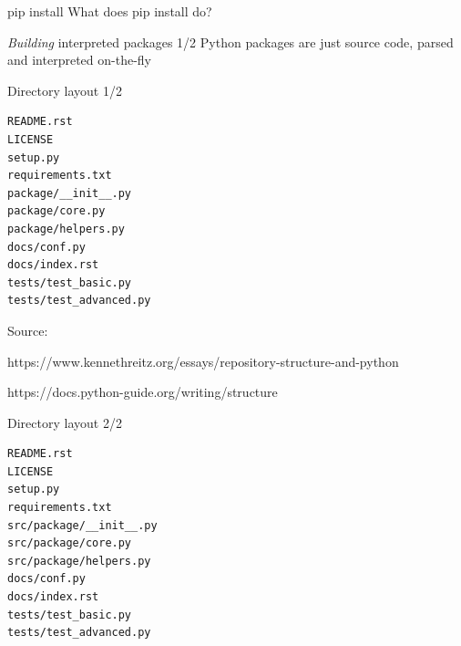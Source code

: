 \documentclass[pdf]{beamer}
\begin{document}
\begin{frame}{pip install}
    What does pip install do?
    \note{
    }
\end{frame}


\begin{frame}{\emph{Building} interpreted packages 1/2}
    Python packages are just source code, parsed and interpreted on-the-fly

\end{frame}

\begin{frame}[fragile]{Directory layout 1/2}
    \begin{verbatim}
README.rst
LICENSE
setup.py
requirements.txt
package/__init__.py
package/core.py
package/helpers.py
docs/conf.py
docs/index.rst
tests/test_basic.py
tests/test_advanced.py
    \end{verbatim}

{\tiny Source: }

{\tiny https://www.kennethreitz.org/essays/repository-structure-and-python}

{\tiny https://docs.python-guide.org/writing/structure}
\end{frame}

\begin{frame}[fragile]{Directory layout 2/2}
    \begin{verbatim}
README.rst
LICENSE
setup.py
requirements.txt
src/package/__init__.py
src/package/core.py
src/package/helpers.py
docs/conf.py
docs/index.rst
tests/test_basic.py
tests/test_advanced.py
    \end{verbatim}

\end{frame}
\end{document}
